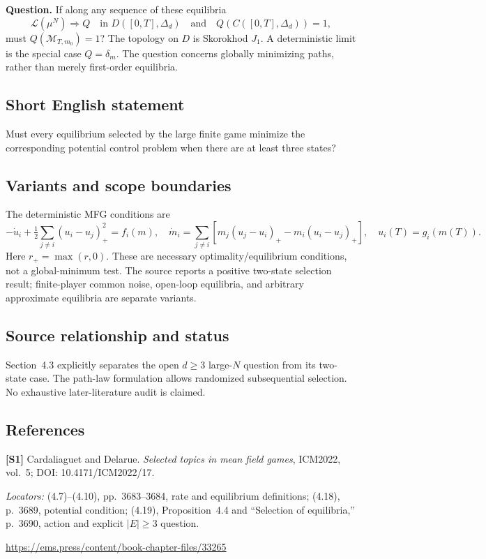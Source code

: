 \documentclass[11pt,a4paper]{article}
\begin{document}
\textbf{Question.} If along any sequence of these equilibria
\[
 \mathcal L(\mu^N)\Longrightarrow Q
 \quad\text{in }D([0,T],\Delta_d)
 \quad\text{and}\quad Q(C([0,T],\Delta_d))=1,
\]
must $Q(\mathcal M_{T,m_0})=1$? The topology on $D$ is Skorokhod $J_1$. A deterministic limit is the special case $Q=\delta_m$. The question concerns globally minimizing paths, rather than merely first-order equilibria.
\subsection*{Short English statement}
Must every equilibrium selected by the large finite game minimize the corresponding potential control problem when there are at least three states?
\subsection*{Variants and scope boundaries}
The deterministic MFG conditions are
\[
 -\dot u_i+\tfrac12\sum_{j\ne i}(u_i-u_j)_+^2=f_i(m),\quad
 \dot m_i=\sum_{j\ne i}[m_j(u_j-u_i)_+-m_i(u_i-u_j)_+],\quad
 u_i(T)=g_i(m(T)).
\]
Here $r_+=\max(r,0)$. These are necessary optimality/equilibrium conditions, not a global-minimum test. The source reports a positive two-state selection result; finite-player common noise, open-loop equilibria, and arbitrary approximate equilibria are separate variants.
\subsection*{Source relationship and status}
Section~4.3 explicitly separates the open $d\geq3$ large-$N$ question from its two-state case. The path-law formulation allows randomized subsequential selection. No exhaustive later-literature audit is claimed.
\subsection*{References}
\begingroup\footnotesize\raggedright
{\footnotesize\raggedright
\textbf{[S1]} Cardaliaguet and Delarue. \emph{Selected topics in mean field games}, ICM2022, vol.~5; DOI: 10.4171/ICM2022/17.\par
\textit{Locators:} (4.7)--(4.10), pp.~3683--3684, rate and equilibrium definitions; (4.18), p.~3689, potential condition; (4.19), Proposition~4.4 and ``Selection of equilibria,'' p.~3690, action and explicit $|E|\geq3$ question.\par
\url{https://ems.press/content/book-chapter-files/33265}\par}
\par\endgroup
\end{document}
